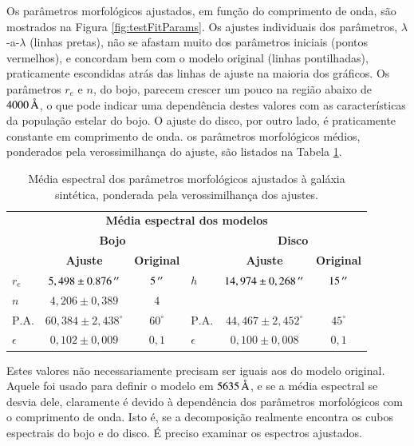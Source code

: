 Os parâmetros morfológicos ajustados, em função do comprimento de onda, são
mostrados na Figura \ref{fig:testFitParams}. Os ajustes individuais dos
parâmetros, $\lambda$-a-$\lambda$ (linhas pretas), não se afastam muito dos
parâmetros iniciais (pontos vermelhos), e concordam bem com o modelo original
(linhas pontilhadas), praticamente escondidas atrás das linhas de ajuste na
maioria dos gráficos. Os parâmetros $r_e$ e $n$, do bojo, parecem crescer um
pouco na região abaixo de $4000\,\text{\normalfont\AA}$, o que pode indicar uma dependência
destes valores com as características da população estelar do bojo. O ajuste do
disco, por outro lado, é praticamente constante em comprimento de onda.
os parâmetros morfológicos médios, ponderados pela verossimilhança do ajuste,
são listados na Tabela \ref{tab:testeModeloAjuste}.

\begin{table}
\begin{tabular}{ l c c l c c }
  \hline
  \multicolumn{6}{c}{\textbf{Média espectral dos modelos}} \\
  & \multicolumn{2}{c}{\textbf{Bojo}} & & \multicolumn{2}{c}{\textbf{Disco}} \\
  & \textbf{Ajuste} & \textbf{Original} & & \textbf{Ajuste} & \textbf{Original} \\
  \hline
  $r_e$ & $5,498 \pm 0.876\,^{\prime\prime}$ & $5\,^{\prime\prime}$ & $h$ & $14,974 \pm
  0,268\,^{\prime\prime}$ & $15\,^{\prime\prime}$ \\
  $n$ & $4,206 \pm 0,389$ & $4$ & & & \\
  $\mathrm{P.A.}$ & $60,384 \pm 2,438^\circ$ & $60^\circ$ & $\mathrm{P.A.}$ &
  $44,467 \pm 2,452^\circ$ & $45^\circ$ \\
  $\epsilon$ & $0,102 \pm 0,009$ & $0,1$ & $\epsilon$ & $0,100 \pm 0,008$ &
  $0,1$ \\
  \hline
\end{tabular}
\caption[Ajuste morfológico espectral -- média dos parâmetros]
{Média espectral dos parâmetros morfológicos ajustados à galáxia sintética,
ponderada pela verossimilhança dos ajustes.}
\label{tab:testeModeloAjuste}
\end{table}

Estes valores não necessariamente precisam ser iguais aos do modelo original.
Aquele foi usado para definir o modelo em $5635\,\text{\normalfont\AA}$, e se a média
espectral se desvia dele, claramente é devido à dependência dos parâmetros
morfológicos com o comprimento de onda. Isto é, se a decomposição realmente
encontra os cubos espectrais do bojo e do disco. É preciso examinar os espectros
ajustados.

